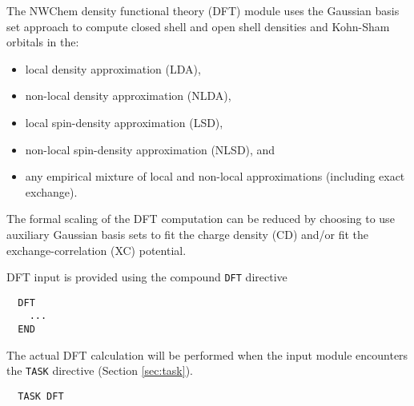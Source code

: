 \label{sec:dft}

The NWChem density functional theory (DFT) module uses the
Gaussian basis set approach to compute
closed shell and open shell densities and Kohn-Sham orbitals
in the: 
\begin{itemize}
\item local density approximation (LDA), 
\item non-local density approximation (NLDA), 
\item local spin-density approximation (LSD), 
\item non-local spin-density approximation (NLSD), and
\item any empirical mixture of local and non-local approximations 
(including exact exchange).
\end{itemize}

The formal scaling of the DFT computation can be reduced by choosing
to use auxiliary Gaussian basis sets to fit the charge density (CD) and/or 
fit the exchange-correlation (XC) potential.

DFT input is provided using the compound \verb+DFT+ directive
\begin{verbatim}
  DFT
    ...
  END
\end{verbatim}
The actual DFT calculation will be performed when the input module
encounters the \verb+TASK+ directive (Section \ref{sec:task}).  
\begin{verbatim}
  TASK DFT
\end{verbatim}

